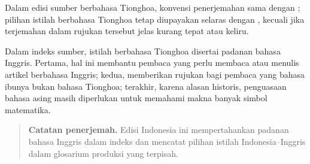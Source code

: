 Dalam edisi sumber berbahasa Tionghoa, konvensi penerjemahan sama dengan
\cite{Li1}; pilihan istilah berbahasa Tionghoa tetap diupayakan selaras dengan
\cite{ZG}, kecuali jika terjemahan dalam rujukan tersebut jelas kurang tepat
atau keliru.

Dalam indeks sumber, istilah berbahasa Tionghoa disertai padanan bahasa
Inggris. Pertama, hal ini membantu pembaca yang perlu membaca atau menulis
artikel berbahasa Inggris; kedua, memberikan rujukan bagi pembaca yang bahasa
ibunya bukan bahasa Tionghoa; terakhir, karena alasan historis, penguasaan
bahasa asing masih diperlukan untuk memahami makna banyak simbol matematika.

\begin{quote}\small
\textbf{Catatan penerjemah.} Edisi Indonesia ini mempertahankan padanan bahasa
Inggris dalam indeks dan mencatat pilihan istilah Indonesia--Inggris dalam
glosarium produksi yang terpisah.
\end{quote}
